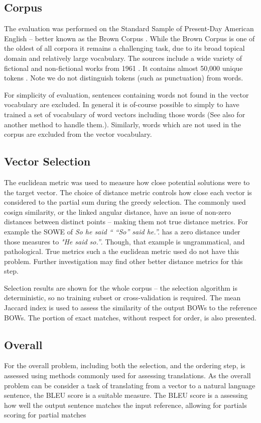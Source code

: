 \documentclass[11pt]{article}
\theoremstyle{plain}
\theoremstyle{definition}
\begin{document}
\subsection{Corpus}
The evaluation was performed on the  Standard Sample of Present-Day American English -- better known as the Brown Corpus \parencite{francis1979brown}. While the Brown Corpus is one of the oldest of all corpora it remains a challenging task, due to its broad topical domain and relatively large vocabulary. The sources include a wide variety of fictional and non-fictional works from 1961 \parencite{francis1979brown}. It contains almost 50,000 unique tokens . Note we do not distinguish tokens (such as punctuation) from words.


For simplicity of evaluation, sentences containing words not found in the vector vocabulary are excluded.  In general it is of-course possible to simply to have trained a set of vocabulary of word vectors including those words (See also  for another method to handle them.). Similarly, words which are not used in the corpus are excluded from the vector vocabulary. 

\subsection{Vector Selection}
The euclidean metric was used to measure how close potential solutions were to the target vector. The choice of distance metric controls how close each vector is considered to the partial sum during the greedy selection. The commonly used cosign similarity, or the linked angular distance, have an issue of non-zero distances between distinct points -- making them not true distance metrics. For example the SOWE of \emph{So he said `` ``So'' said he.''.} has a zero distance under those measures to \emph{"He said so.''}. Though, that example is ungrammatical, and pathological. True metrics such a the euclidean metric used do not have this problem. Further investigation may find other better distance metrics for this step.

Selection results are shown for the whole corpus -- the selection algorithm is deterministic, so no training subset or cross-validation is required. The mean Jaccard index is used to assess the similarity of the output BOWs to the reference BOWs. The portion of exact matches, without respect for order, is also presented.

\subsection{Overall}
For the overall problem, including both the selection, and the ordering step, is assessed using methods commonly used for assessing translations. As the overall problem can be consider a task of translating from a vector to a natural language sentence, the BLEU  score \parencite{Papineni2002} is a suitable measure. The BLEU score is a assessing how well the output sentence matches the input reference, allowing for partials scoring for partial matches
\end{document}
